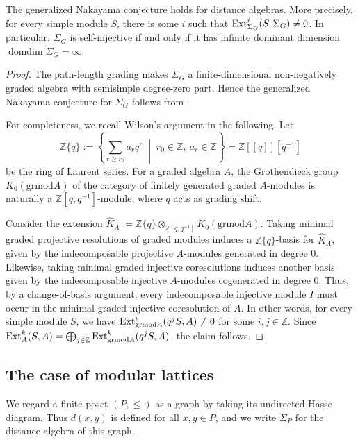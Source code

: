 \documentclass[a4paper,leqno]{amsart}
\begin{document}
\begin{prop}
The generalized Nakayama conjecture holds for distance algebras. More
precisely,
for every simple module $S$, there is some $i$ such that $\operatorname{Ext}_{\Sigma_G}^i(S,\Sigma_G)\neq 0$.
In particular, $\Sigma_G$ is self-injective if and only if it has infinite dominant dimension $\operatorname{domdim}\Sigma_G=\infty$.
\end{prop}

\begin{proof}
The path-length grading makes $\Sigma_G$ a finite-dimensional
non-negatively graded algebra with semisimple degree-zero part. 
Hence the generalized Nakayama conjecture for $\Sigma_G$ follows from \cite[Section~2]{Wil83}.

For completeness, we recall Wilson's argument in the following.
Let
$$\mathbb Z\{q\}:=\left\{
\sum_{r\geq r_0}a_rq^r
\;\middle|\;
r_0\in\mathbb Z,\ a_r\in\mathbb Z
\right\}=\mathbb Z[[q]][q^{-1}]$$
be the ring of Laurent series.
For a graded algebra $A$, the Grothendieck group $K_0(\mathrm{grmod} A)$ of the category of finitely generated graded $A$-modules is naturally a $\mathbb{Z}[q,q^{-1}]$-module, where $q$ acts as grading shift.

Consider the extension $\widehat{K}_A := \mathbb{Z}\{q\}\otimes_{\mathbb{Z}[q,q^{-1}]} K_0(\mathrm{grmod} A)$. Taking minimal graded projective resolutions of graded modules induces a $\mathbb{Z}\{q\}$-basis for $\widehat{K}_A$, given by the indecomposable projective $A$-modules generated in degree $0$.
Likewise, taking minimal graded injective coresolutions induces another basis given by the indecomposable injective $A$-modules cogenerated in degree $0$.
Thus, by a change-of-basis argument, every indecomposable injective module $I$ must occur in the minimal graded injective coresolution of $A$.  In other words, for every simple module $S$, we have $\operatorname{Ext}_{\mathrm{grmod}A}^i(q^jS,A)\neq 0$ for some $i,j\in \mathbb{Z}$.  Since $\operatorname{Ext}_A^k(S,A) = \bigoplus_{j\in\mathbb{Z}} \operatorname{Ext}_{\mathrm{grmod} A}^k(q^jS,A)$, the claim follows.   
\end{proof}


\subsection{The case of modular lattices}\label{subsec:modular-lattice}

We regard a finite poset $(P,\leq)$ as a graph by taking its undirected Hasse diagram. Thus $d(x,y)$ is defined for all $x,y\in P$, and we write $\Sigma_P$ for the distance algebra of this graph.
\end{document}
